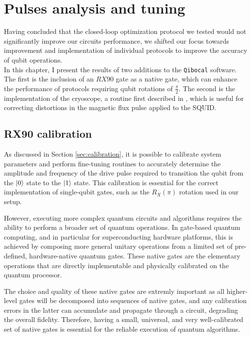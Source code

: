 \chapter{Pulses analysis and tuning}

Having concluded that the closed-loop optimization protocol we tested would not significantly improve our circuits performance, we shifted our focus towards improvement and implementation of individual protocols to improve the accuracy of qubit operations.\\
In this chapter, I present the results of two additions to the \texttt{Qibocal} software. 
The first is the inclusion of an $RX90$ gate as a native gate, which can enhance the performance of protocols requiring qubit rotations of $\frac{\pi}{2}$.
The second is the implementation of the cryoscope, a routine first described in \cite{rol_time-domain_2020}, which is useful for correcting distortions in the magnetic flux pulse applied to the SQUID.

\section{RX90 calibration}
As discussed in Section \ref{sec:calibration}, it is possible to calibrate system parameters and perform fine-tuning routines to accurately determine the amplitude and frequency of the drive pulse required to transition the qubit from the $\ket{0}$ state to the $\ket{1}$ state. 
This calibration is essential for the correct implementation of single-qubit gates, such as the $R_X(\pi)$ rotation used in our setup.

However, executing more complex quantum circuits and algorithms requires the ability to perform a broader set of quantum operations. 
In gate-based quantum computing, and in particular for superconducting hardware platforms, this is achieved by composing more general unitary operations from a limited set of pre-defined, hardware-native quantum gates. 
These native gates are the elementary operations that are directly implementable and physically calibrated on the quantum processor.

The choice and quality of these native gates are extremly important as all higher-level gates will be decomposed into sequences of native gates, and any calibration errors in the latter can accumulate and propagate through a circuit, degrading the overall fidelity. 
Therefore, having a small, universal, and very well-calibrated set of native gates is essential for the reliable execution of quantum algorithms.

